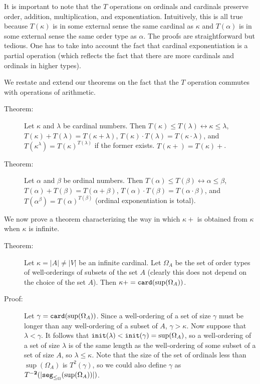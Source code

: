 \documentclass[12pt]{book}
\begin{document}
It is important to note that the $T$ operations on ordinals and
cardinals preserve order, addition, multiplication, and
exponentiation.  Intuitively, this is all true because $T(\kappa)$ is
in some external sense the same cardinal as $\kappa$ and $T(\alpha)$
is in some external sense the same order type as $\alpha$.  The proofs
are straightforward but tedious.  One has to take into account the
fact that cardinal exponentiation is a partial operation (which
reflects the fact that there are more cardinals and ordinals in higher
types).

We restate and extend our theorems on the fact that the $T$ operation
commutes with operations of arithmetic.

\begin{description}

\item[Theorem:]  Let $\kappa$ and $\lambda$ be cardinal numbers.  Then
$T(\kappa)\leq T(\lambda) \leftrightarrow \kappa \leq \lambda$, $T(\kappa)+T(\lambda) = T(\kappa+\lambda)$, $T(\kappa)\cdot T(\lambda) = T(\kappa\cdot\lambda)$,
and $T(\kappa^{\lambda}) = T(\kappa)^{T(\lambda)}$ if the former exists.
$T(\kappa+) = T(\kappa)+$.

\item[Theorem:] Let $\alpha$ and $\beta$ be ordinal numbers.  Then
$T(\alpha)\leq T(\beta) \leftrightarrow \alpha \leq \beta$, $T(\alpha)+T(\beta)
= T(\alpha+\beta)$, $T(\alpha)\cdot T(\beta) = T(\alpha\cdot\beta)$,
and $T(\alpha^{\beta}) = T(\alpha)^{T(\beta)}$ (ordinal
exponentiation is total).



\end{description}

We now prove a theorem characterizing the way in which $\kappa+$ is
obtained from $\kappa$ when $\kappa$ is infinite.

\begin{description}

\item[Theorem:] Let $\kappa=|A|\neq |V|$ be an infinite cardinal.  Let
$\Omega_A$ be the set of order types of well-orderings of subsets of
the set $A$ (clearly this does not depend on the choice of the set
$A$).  Then $\kappa+ = {\tt card}(\sup(\Omega_A))$.

\item[Proof:] Let $\gamma = {\tt card}(\sup(\Omega_A))$.  Since a
well-ordering of a set of size $\gamma$ must be longer than any
well-ordering of a subset of $A$, $\gamma>\kappa$.  Now suppose that
$\lambda<\gamma$.  It follows that ${\tt init}(\lambda)<{\tt
init}(\gamma)= \sup(\Omega_A)$, so a well-ordering of a set of size
$\lambda$ is of the same length as the well-ordering of some subset of
a set of size $A$, so $\lambda \leq \kappa$.  Note that the size of
the set of ordinals less than $\sup(\Omega_A)$ is $T^2(\gamma)$, so we
could also define $\gamma$ as $T^{\bf -2}(|{\tt
seg}_{\leq_{\Omega}}(\sup(\Omega_A))|)$.

\end{description}
\end{document}
